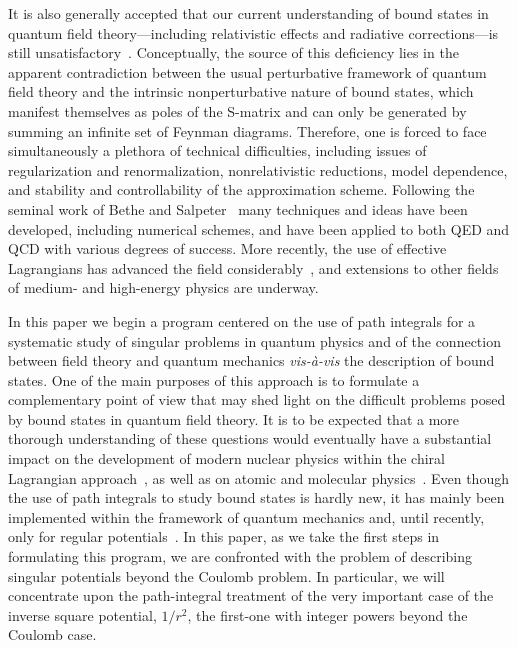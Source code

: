 \documentclass[a4paper,preprint,draft,showpacs,amsmath,amsfonts,amssymb,aps,prd]{revtex4}%
\begin{document}
It is also generally accepted that 
our current
understanding 
of bound states in quantum field theory---including relativistic effects and 
radiative corrections---is still unsatisfactory~\cite{wei:95,jac:private}.
Conceptually, the source of this deficiency lies in the apparent
contradiction between the usual perturbative framework of quantum field
theory and the intrinsic nonperturbative nature 
of bound states, which manifest themselves
as poles of the S-matrix and can only be generated by summing an infinite 
set of Feynman diagrams.   
Therefore, one is forced to face simultaneously
a plethora of technical difficulties, including
issues of regularization and renormalization,
nonrelativistic reductions, model dependence, and stability and
controllability of the approximation scheme.
Following the seminal work of Bethe and 
Salpeter~\cite{bet:51} many techniques and ideas have been developed, 
including numerical schemes, and have been applied to both QED and QCD with 
various degrees of success.  
More recently, the use of effective Lagrangians
has advanced the field considerably~\cite{recent_review},
and extensions to other fields of medium- and
high-energy physics are underway.  

In this paper we begin a program centered on the use of path
integrals for a systematic study of singular problems in quantum physics
and of the connection between field theory and
quantum mechanics {\it vis-\`{a}-vis\/} 
the description of bound states.
One of the main purposes of this approach is to formulate a
complementary point of view that may shed light on the 
difficult problems posed by bound states in quantum field theory.
It is to be expected that a more thorough 
understanding of these questions would eventually have a
substantial impact on the development of modern nuclear physics within 
the chiral Lagrangian approach~\cite{recent_review}, 
as well as on atomic and 
molecular physics~\cite{fra:71}.  
Even though the use of path integrals to study bound
states is hardly new, it has mainly been implemented within
the framework of quantum mechanics and, until recently, only for regular
potentials~\cite{kleinert,sav:99}. 
In this paper,
as we take the first steps in formulating this program,
we are confronted with the problem of describing singular potentials beyond
the Coulomb problem.  
In particular, we will concentrate upon the path-integral
treatment of the very important case of the inverse square potential,
$1/r^{2}$, the first-one with integer powers beyond the Coulomb case.  
\end{document}
